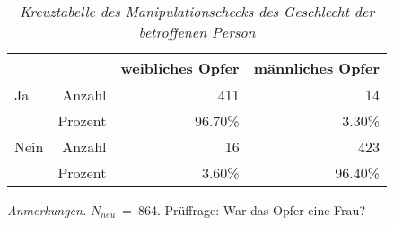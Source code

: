 \begin{table}[htb]
    \caption[Kreuztabelle Manipulationscheck Opfergeschlecht]{\textit {Kreuztabelle des Manipulationschecks des Geschlecht der betroffenen Person}} 
    \label{KT_sex}
    \centering
    \begin{adjustbox}{width=10cm} %
    \small
    \begin{tabular}{lrrr}
      \hline
        &   & weibliches Opfer & männliches Opfer \\
      \hline
    Ja   & Anzahl  & 411      & 14      \\
    & Prozent & 96.70\%  & 3.30\%  \\
    Nein & Anzahl  & 16       & 423     \\
    & Prozent & 3.60\%   & 96.40\% \\
       \hline
    \end{tabular}
    \end{adjustbox}
    
    \begin{tablenotes}
        \item \textit{Anmerkungen.} \( N_{neu} \)~=~864. Prüffrage: War das Opfer eine Frau?
      \end{tablenotes}
    \end{table}



